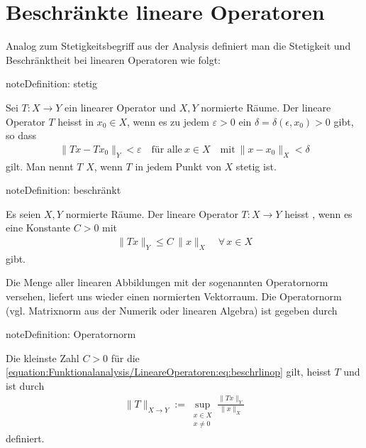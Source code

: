 \documentclass[letterpaper,10pt,english]{jupyterBook}
\begin{document}
\section{Beschränkte lineare Operatoren}
\label{\detokenize{Funktionalanalysis/LineareOperatoren:beschrankte-lineare-operatoren}}
Analog zum Stetigkeitsbegriff aus der Analysis definiert man die Stetigkeit und Beschränktheit bei linearen Operatoren wie folgt:

\begin{sphinxadmonition}{note}{Definition: stetig}

Sei \(T: X\to Y\) ein linearer Operator und \(X, Y\) normierte Räume. Der lineare Operator \(T\) heisst  in \(x_0\in X\), wenn es zu jedem \(\varepsilon > 0\) ein \(\delta = \delta(\epsilon, x_0)>0\) gibt, so dass
\begin{equation*}
\begin{split}\| T x- T x_0\|_Y < \varepsilon\quad\text{für alle}\ x\in X \quad\text{mit}\ \|x-x_0\|_X < \delta\end{split}
\end{equation*}
gilt. Man nennt \(T\)  \(X\), wenn \(T\) in jedem Punkt von \(X\) stetig ist.
\end{sphinxadmonition}

\begin{sphinxadmonition}{note}{Definition: beschränkt}

Es seien \(X, Y\) normierte Räume. Der lineare Operator \(T: X \to Y\) heisst , wenn es eine Konstante \(C>0\) mit
\begin{equation}\label{equation:Funktionalanalysis/LineareOperatoren:eq:beschrlinop}
\begin{split}\|T x\|_Y \le C\, \|x\|_X\quad\forall\,x\in X\end{split}
\end{equation}
gibt.
\end{sphinxadmonition}

Die Menge aller linearen Abbildungen mit der sogenannten Operatornorm versehen, liefert uns wieder einen normierten Vektorraum. Die Operatornorm (vgl. Matrixnorm aus der Numerik oder linearen Algebra) ist gegeben durch

\begin{sphinxadmonition}{note}{Definition: Operatornorm}

Die kleinste Zahl \(C>0\) für die \eqref{equation:Funktionalanalysis/LineareOperatoren:eq:beschrlinop} gilt, heisst  \(T\) und ist durch
\begin{equation}\label{equation:Funktionalanalysis/LineareOperatoren:eq:operatornorm}
\begin{split}\|T\|_{X\to Y} := \sup_{\substack{x\in X\\x\not= 0}} \frac{\|T x\|_Y}{\|x\|_X}\end{split}
\end{equation}
definiert.
\end{sphinxadmonition}
\end{document}
